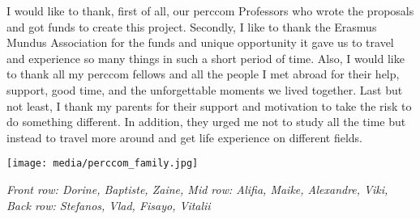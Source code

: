 \documentclass[10pt,a4paper]{article} %
\begin{document}
\begin{multicols}{3}
I would like to  thank, first of all, our {\sc perccom} Professors who wrote the 
proposals and got funds to create this project. 
Secondly, I like to thank the Erasmus Mundus Association for the funds and unique 
opportunity it gave us to travel and experience so many things in such a short 
period of time. 
Also, I would like to thank all my {\sc perccom} fellows and all the people I met 
abroad for their help, support, 
good time, and the unforgettable moments we lived together. 
Last but not least, I thank my parents for their support and motivation to take the 
risk to do something different. 
In addition, they urged me not to study all the time but instead to travel more 
around and get life experience on different fields.

\end{multicols}


\begin{center}
	\vspace{10pt}
	\texttt{[image: media/perccom\_family.jpg]} %
	\vspace{10pt}
		\par\textit{Front row: Dorine, Baptiste, Zaine, Mid row: Alifia, Maike, Alexandre, Viki, Back row: Stefanos, Vlad, Fisayo, Vitalii}
\end{center}
\end{document}

